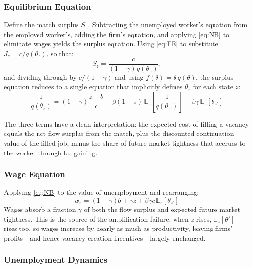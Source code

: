 \documentclass[12pt]{article}
\begin{document}
\subsubsection*{Equilibrium Equation}

Define the match surplus $S_z$. Subtracting the unemployed worker's equation
from the employed worker's, adding the firm's equation, and applying
\eqref{eq:NB} to eliminate wages yields the surplus equation. Using
\eqref{eq:FE} to substitute $J_z = c/q(\theta_z)$, so that:
\begin{equation}
    S_z = \frac{c}{(1-\gamma)\,q(\theta_z)},
\end{equation}
and dividing through by $c/(1-\gamma)$ and using $f(\theta) = \theta\,q(\theta)$,
the surplus equation reduces to a single equation that implicitly defines
$\theta_z$ for each state $z$:
\begin{equation}\label{eq:EQ}
\boxed{
    \frac{1}{q(\theta_z)} = (1-\gamma)\frac{z - b}{c}
    + \beta(1-s)\,\mathbb{E}_z\!\left[\frac{1}{q(\theta_{z'})}\right]
    - \beta\gamma\,\mathbb{E}_z\!\left[\theta_{z'}\right]
}
\end{equation}

The three terms have a clean interpretation: the expected cost of filling a
vacancy equals the net flow surplus from the match, plus the discounted
continuation value of the filled job, minus the share of future market
tightness that accrues to the worker through bargaining.

\subsubsection*{Wage Equation}

Applying \eqref{eq:NB} to the value of unemployment and rearranging:
\begin{equation}
    w_z = (1-\gamma)b + \gamma z + \beta\gamma c\,\mathbb{E}_z[\theta_{z'}]
\end{equation}
Wages absorb a fraction $\gamma$ of both the flow surplus and expected future
market tightness. This is the source of the amplification failure: when $z$
rises, $\mathbb{E}_z[\theta']$ rises too, so wages increase by nearly as much
as productivity, leaving firms' profits---and hence vacancy creation
incentives---largely unchanged.

\subsubsection*{Unemployment Dynamics}
\end{document}
